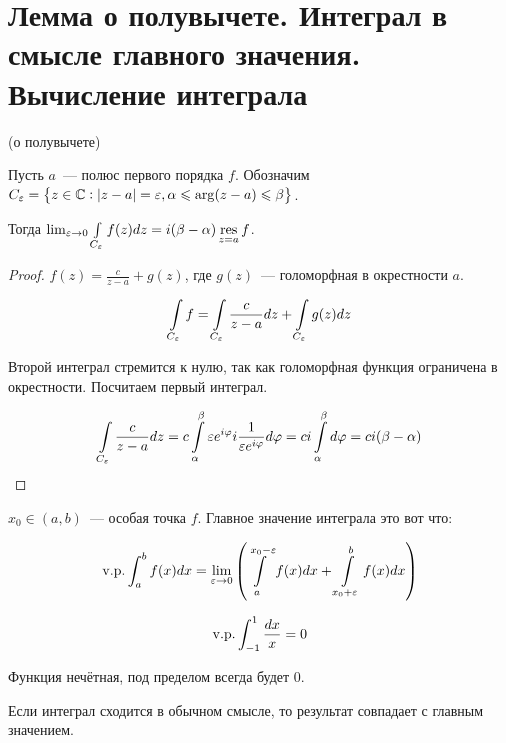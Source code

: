\section{Лемма о полувычете. Интеграл в смысле главного значения. Вычисление интеграла}

\begin{lemma}(о полувычете)

    Пусть $a$~--- полюс первого порядка $f$.
    Обозначим $C_{\varepsilon} = \left\{
        z \in \mathbb{C} :
        |z-a| = \varepsilon,
        \alpha \leqslant \arg(z-a) \leqslant \beta
        \right\}$.

    Тогда $\lim_{\varepsilon \to 0} \int\limits_{C_\varepsilon} f(z)dz
        = i(\beta - \alpha)\operatorname*{res}\limits_{z=a} f$.
\end{lemma}

\begin{proof}
    $f(z) = \frac{c}{z-a} + g(z)$,
    где $g(z)$~--- голоморфная в окрестности $a$.

    \[
        \int\limits_{C_\varepsilon} f = \int\limits_{C_\varepsilon} \frac{c}{z-a}dz + \int\limits_{C_\varepsilon}
        g(z)dz
    \]

    Второй интеграл стремится к нулю, так как голоморфная функция
    ограничена в окрестности. Посчитаем первый интеграл.

    \[
        \int\limits_{C_\varepsilon} \frac{c}{z-a}dz
        = c \int\limits_\alpha^\beta \varepsilon e^{i\varphi} i \frac{1}{\varepsilon e^{i\varphi}}
        d\varphi = ci \int\limits_\alpha^\beta d\varphi = ci (\beta - \alpha)
    \]
\end{proof}

\begin{definition}
    $x_0 \in (a, b)$~--- особая точка $f$.
    Главное значение интеграла это вот что:

    \[
        \mathrm{v. p. }\int_a^b f(x)dx = \lim_{\varepsilon\to0}
        \left(
        \int\limits_a^{x_0 - \varepsilon} f(x)dx
        + \int\limits_{x_0 + \varepsilon}^b f(x)dx
        \right)
    \]
\end{definition}

\begin{example}
    \[
        \mathrm{v. p. }\int_{-1}^1 \frac{dx}{x} = 0
    \]

    Функция нечётная, под пределом всегда будет $0$.
\end{example}

\begin{observation}
    Если интеграл сходится в обычном смысле,
    то результат совпадает с главным значением.
\end{observation}


